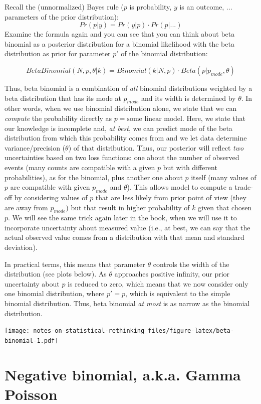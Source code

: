 \documentclass[
]{book}
\begin{document}
Recall the (unnormalized) Bayes rule (\(p\) is probability, \(y\) is an outcome, \(...\) parameters of the prior distribution):
\[
Pr(p | y) = Pr(y | p) \cdot Pr(p | ...)
\]
Examine the formula again and you can see that you can think about beta binomial as a posterior distribution for a binomial likelihood with the beta distribution as prior for parameter \(p'\) of the binomial distribution:

\[BetaBinomial(N, p, \theta | k) = Binomial(k|N,p) \cdot Beta(p| p_{mode}, \theta)\]

Thus, beta binomial is a combination of \emph{all} binomial distributions weighted by a beta distribution that has its mode at \(p_{mode}\) and its width is determined by \(\theta\). In other words, when we use binomial distribution alone, we state that we can \emph{compute} the probability directly as \(p = \text{some linear model}\). Here, we state that our knowledge is incomplete and, \emph{at best}, we can predict mode of the beta distribution from which this probability comes from and we let data determine variance/precision (\(\theta\)) of that distribution. Thus, our posterior will reflect \emph{two} uncertainties based on two loss functions: one about the number of observed events (many counts are compatible with a given \(p\) but with different probabilities), as for the binomial, plus another one about \(p\) itself (many values of \(p\) are compatible with given \(p_{mode}\) and \(\theta\)). This allows model to compute a trade-off by considering values of \(p\) that are less likely from prior point of view (they are away from \(p_{mode}\)) but that result in higher probability of \(k\) given that chosen \(p\). We will see the same trick again later in the book, when we will use it to incorporate uncertainty about measured value (i.e., at best, we can say that the actual observed value comes from a distribution with that mean and standard deviation).

In practical terms, this means that parameter \(\theta\) controls the width of the distribution (see plots below). As \(\theta\) approaches positive infinity, our prior uncertainty about \(p\) is reduced to zero, which means that we now consider only one binomial distribution, where \(p' = p\), which is equivalent to the simple binomial distribution. Thus, beta binomial \emph{at most} is as narrow as the binomial distribution.

\texttt{[image: notes-on-statistical-rethinking\_files/figure-latex/beta-binomial-1.pdf]}

\hypertarget{negative-binomial-a.k.a.-gamma-poisson}{%
\section{Negative binomial, a.k.a. Gamma Poisson}\label{negative-binomial-a.k.a.-gamma-poisson}}
\end{document}
